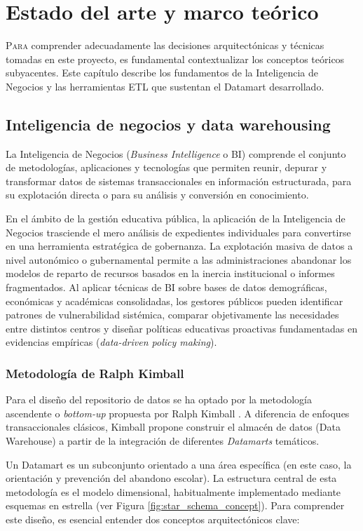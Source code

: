 \chapter{Estado del arte y marco teórico}
\label{chap:estado_arte}

\lettrine{P}{ara} comprender adecuadamente las decisiones arquitectónicas y técnicas tomadas en este proyecto, es fundamental contextualizar los conceptos teóricos subyacentes. Este capítulo describe los fundamentos de la Inteligencia de Negocios y las herramientas ETL que sustentan el Datamart desarrollado.

\section{Inteligencia de negocios y data warehousing}
La Inteligencia de Negocios (\textit{Business Intelligence} o BI) comprende el conjunto de metodologías, aplicaciones y tecnologías que permiten reunir, depurar y transformar datos de sistemas transaccionales en información estructurada, para su explotación directa o para su análisis y conversión en conocimiento.

En el ámbito de la gestión educativa pública, la aplicación de la Inteligencia de Negocios trasciende el mero análisis de expedientes individuales para convertirse en una herramienta estratégica de gobernanza. La explotación masiva de datos a nivel autonómico o gubernamental permite a las administraciones abandonar los modelos de reparto de recursos basados en la inercia institucional o informes fragmentados. Al aplicar técnicas de BI sobre bases de datos demográficas, económicas y académicas consolidadas, los gestores públicos pueden identificar patrones de vulnerabilidad sistémica, comparar objetivamente las necesidades entre distintos centros y diseñar políticas educativas proactivas fundamentadas en evidencias empíricas (\textit{data-driven policy making}).

\subsection{Metodología de Ralph Kimball}
Para el diseño del repositorio de datos se ha optado por la metodología ascendente o \textit{bottom-up} propuesta por Ralph Kimball \cite{Kimball_DWH}. A diferencia de enfoques transaccionales clásicos, Kimball propone construir el almacén de datos (Data Warehouse) a partir de la integración de diferentes \textit{Datamarts} temáticos.

Un Datamart es un subconjunto orientado a una área específica (en este caso, la orientación y prevención del abandono escolar). La estructura central de esta metodología es el modelo dimensional, habitualmente implementado mediante esquemas en estrella (ver Figura \ref{fig:star_schema_concept}). Para comprender este diseño, es esencial entender dos conceptos arquitectónicos clave:

